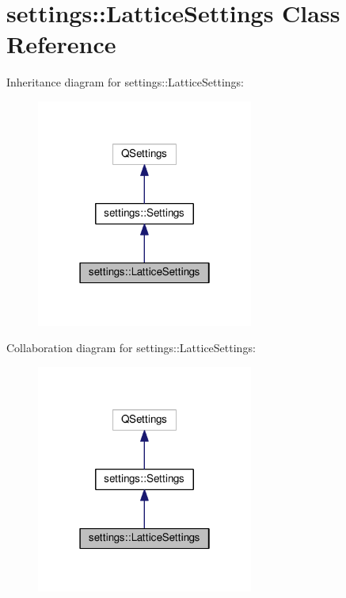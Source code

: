 \hypertarget{classsettings_1_1LatticeSettings}{}\section{settings\+:\+:Lattice\+Settings Class Reference}
\label{classsettings_1_1LatticeSettings}


Inheritance diagram for settings\+:\+:Lattice\+Settings\+:\nopagebreak
\begin{figure}[H]
\begin{center}
\leavevmode
\includegraphics[width=202pt]{classsettings_1_1LatticeSettings__inherit__graph}
\end{center}
\end{figure}


Collaboration diagram for settings\+:\+:Lattice\+Settings\+:\nopagebreak
\begin{figure}[H]
\begin{center}
\leavevmode
\includegraphics[width=202pt]{classsettings_1_1LatticeSettings__coll__graph}
\end{center}
\end{figure}
